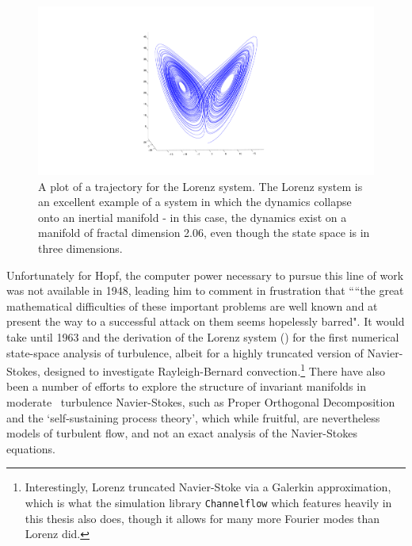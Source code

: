 \begin{figure}[h]
\centerline{
\includegraphics[scale=0.5	]{Figs/LorenzAttractor}}
\caption{A plot of a trajectory for the Lorenz system. The Lorenz system is an excellent example of a system in which the dynamics collapse onto an inertial manifold - in this case, the dynamics exist on a manifold of fractal dimension 2.06, even though the state space is in three dimensions. }\label{fig:LorenzAttractor}
\end{figure}

Unfortunately for Hopf, the computer power necessary to pursue this line of work was not available in 1948, leading him to comment in frustration that ``“the great mathematical difficulties of these important problems are well
known and at present the way to a successful attack on them seems hopelessly
barred". It would take until 1963 and the derivation of the Lorenz system () for the first numerical state-space analysis of turbulence, albeit for a highly truncated version of Navier-Stokes, designed to investigate Rayleigh-Bernard convection.\footnote{Interestingly, Lorenz truncated Navier-Stoke via a Galerkin approximation, which is what the simulation library {\tt Channelflow} which features heavily in this thesis also does, though it allows for many more Fourier modes than Lorenz did.} There have also been a number of efforts to explore the structure of invariant manifolds in moderate \ReN\ turbulence Navier-Stokes, such as Proper Orthogonal Decomposition and the `self-sustaining process theory', which while fruitful, are nevertheless models of turbulent flow, and not an exact analysis of the Navier-Stokes equations.\\


